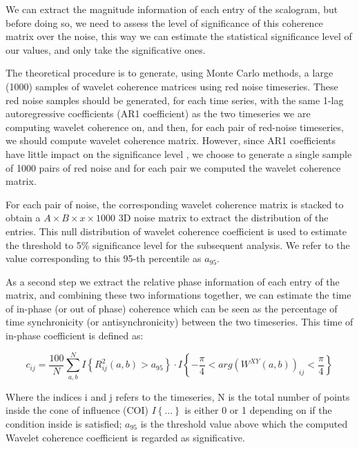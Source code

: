 \documentclass[11pt]{report}
\begin{document}
We can extract the magnitude information of each entry of the scalogram, but before doing so, we need to assess the level of significance of this coherence matrix over the noise, this way we can estimate the statistical significance level of our values, and only take the significative ones.

The theoretical procedure \cite{grinsted-2004} \cite{bernas-2018} is to generate, using Monte Carlo methods, a large (1000) samples of wavelet coherence matrices using red noise timeseries. \cite{hartmann-2014}
These red noise samples should be generated, for each time series, with the same 1-lag autoregressive coefficients (AR1 coefficient) as the two timeseries we are computing wavelet coherence on, and then, for each pair of red-noise timeseries, we should compute wavelet coherence matrix.
However, since AR1 coefficients have little impact on the significance level \cite{grinsted-2004}, we choose to generate a single sample of 1000 pairs of red noise and for each pair we computed the wavelet coherence matrix.

For each pair of noise, the corresponding wavelet coherence matrix is stacked to obtain a $A\times B \times x \times 1000$ 3D noise matrix to extract the distribution of the entries.
This null distribution of wavelet coherence coefficient is used to estimate the threshold to 5\% significance level for the subsequent analysis.
We refer to the value corresponding to this 95-th percentile as $a_{95}$.


As a second step we extract the relative phase information of each entry of the matrix, and combining these two informations together, we can estimate the time of in-phase (or out of phase) coherence which can be seen as the percentage of time synchronicity (or antisynchronicity) between the two timeseries. \cite{bernas-2018}
This time of in-phase coefficient is defined as:

\begin{equation} \label{eq:wcohcoefficients}
c_{ij} = \frac{100}{N}\sum_{a, b}^N I\left\{ R_{ij}^2(a,b) > a_{95}\right\}\cdot I\left\{-\frac{\pi}{4}<arg(W^{XY}(a, b))_{ij} < \frac{\pi}{4}  \right\}
\end{equation}

Where the indices i and j refers to the timeseries, N is the total number of points inside the cone of influence (COI) $I\left\{ ...\right\}$ is either 0 or 1 depending on if the condition inside is satisfied; $a_{95}$ is the threshold value above which the computed Wavelet coherence coefficient is regarded as significative.
\end{document}

